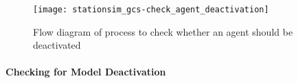\begin{figure}[h]
    \centering
    \texttt{[image: stationsim\_gcs-check\_agent\_deactivation]}
    \caption{Flow diagram of process to check whether an agent should be
    deactivated}\label{fig:flow:check_agent_deactivation}
\end{figure}

\paragraph{Checking for Model
Deactivation}\label{para:submodels:model_deactivation}

